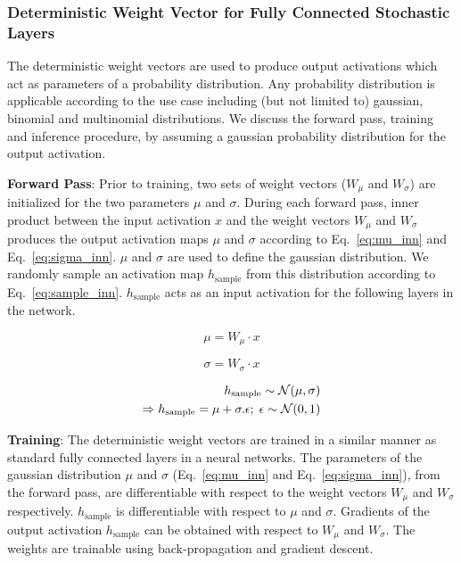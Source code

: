 \documentclass[12pt, letterpaper]{article}
\begin{document}
\subsubsection{Deterministic Weight Vector for Fully Connected Stochastic Layers} 
The deterministic weight vectors are used to produce output activations which act as parameters of a probability distribution. 
Any probability distribution is applicable according to the use case including (but not limited to) gaussian, binomial and multinomial distributions.  
We discuss the forward pass, training and inference procedure, by assuming a gaussian probability distribution for the output activation. 

\textbf{Forward Pass}: Prior to training, two sets of weight vectors ($W_\mu$ and $W_\sigma$) are initialized for the two parameters $\mu$ and $\sigma$. During each forward pass, inner product between the input activation $x$ and the weight vectors $W_\mu$ and $W_\sigma$ produces the output activation maps $\mu$ and $\sigma$ according to Eq.~\eqref{eq:mu_inn} and Eq.~\eqref{eq:sigma_inn}. $\mu$ and $\sigma$ are used to define the gaussian distribution. We randomly sample an activation map  $h_\mathrm{sample}$ from this distribution according to Eq.~\eqref{eq:sample_inn}. $h_\mathrm{sample}$ acts as an input activation for the following layers in the network. 

\begin{equation}
\mu=W_\mu \cdot x
\label{eq:mu_inn}
\end{equation}

\begin{equation}
\sigma=W_\sigma \cdot x
\label{eq:sigma_inn}
\end{equation}

\begin{align}
  h_\mathrm{sample} \sim \mathcal{N}(\mu,\sigma) \notag\\
  \Rightarrow h_\mathrm{sample}=\mu + \sigma.\epsilon;\; \epsilon \sim \mathcal{N}(0,1)
  \label{eq:sample_inn}
\end{align}


\textbf{Training}: The deterministic weight vectors are trained in a similar manner as standard fully connected layers in a neural networks. The parameters of the gaussian distribution $\mu$ and $\sigma$ (Eq.~\eqref{eq:mu_inn} and Eq.~\eqref{eq:sigma_inn}), from the forward pass, are differentiable with respect to the weight vectors $W_\mu$ and $W_\sigma$ respectively. $h_\mathrm{sample}$ is differentiable with respect to $\mu$ and $\sigma$. Gradients of the output activation $h_\mathrm{sample}$ can be obtained with respect to $W_\mu$ and $W_\sigma$. The weights are trainable using back-propagation and gradient descent. 
\end{document}
